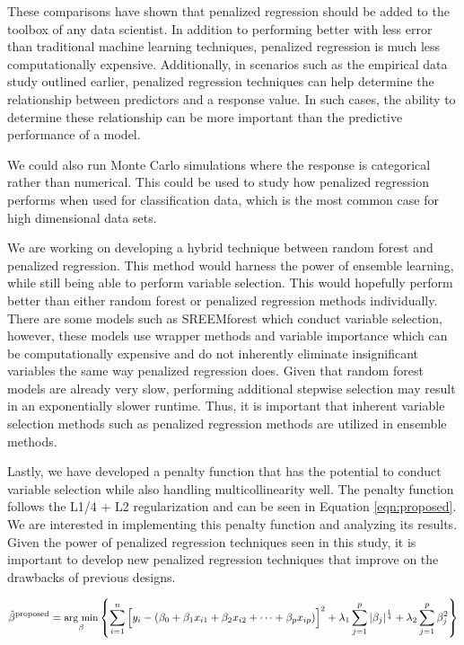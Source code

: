 \documentclass{article}
\newcommand{\argmin}[2]{\underset{#1}{\text{arg min}}\left\{#2\right\}}
\begin{document}
	These comparisons have shown that penalized regression should be added to the toolbox of any data scientist. In addition to performing better with less error than traditional machine learning techniques, penalized regression is much less computationally expensive. Additionally, in scenarios such as the empirical data study outlined earlier, penalized regression techniques can help determine the relationship between predictors and a response value. In such cases, the ability to determine these relationship can be more important than the predictive performance of a model.
	
	We could also run Monte Carlo simulations where the response is categorical rather than numerical. This could be used to study how penalized regression performs when used for classification data, which is the most common case for high dimensional data sets.
	
	We are working on developing a hybrid technique between random forest and penalized regression. This method would harness the power of ensemble learning, while still being able to perform variable selection. This would hopefully perform better than either random forest or penalized regression methods individually. There are some models such as SREEMforest \cite{capitaine2021random} which conduct variable selection, however, these models use wrapper methods and variable importance which can be computationally expensive and do not inherently eliminate insignificant variables the same way penalized regression does. Given that random forest models are already very slow, performing additional stepwise selection may result in an exponentially slower runtime. Thus, it is important that inherent variable selection methods such as penalized regression methods are utilized in ensemble methods.
	
	Lastly, we have developed a penalty function that has the potential to conduct variable selection while also handling multicollinearity well. The penalty function follows the L1/4 + L2 regularization and can be seen in Equation \ref{eqn:proposed}. We are interested in implementing this penalty function and analyzing its results. Given the power of penalized regression techniques seen in this study, it is important to develop new penalized regression techniques that improve on the drawbacks of previous designs.
	
	\begin{equation}
		\label{eqn:proposed}
		\small
		\hat{\beta}^{\text{proposed}} = \argmin{\beta}{\sum\limits_{i = 1}^n \Big[y_i - (\beta_0 + \beta_1 x_{i1} + \beta_2 x_{i2} + \cdots + \beta_p x_{ip})\Big]^2  + \lambda_1\sum\limits_{j = 1}^p \vert \beta_j \vert^{\frac{1}{4}} + \lambda_2\sum\limits_{j = 1}^p \beta_j^2}
	\end{equation}
	
\end{document}
